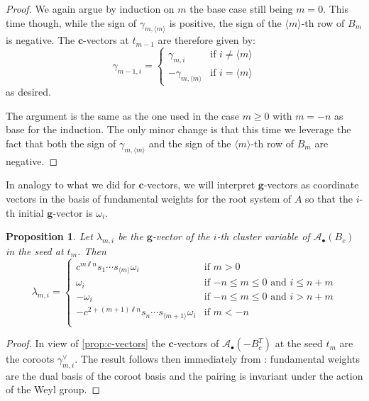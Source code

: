 \documentclass[11pt]{amsart}
\newcommand{\cAb}{\mathcal{A}_\bullet}
\newcommand{\bfg}{\mathbf{g}}
\newcommand{\bfc}{\mathbf{c}}
\renewcommand{\mod}[1]{\langle {#1} \rangle}
\newtheorem{proposition}[theorem]{Proposition}
\numberwithin{equation}{section}
\begin{document}
\begin{proof}
  We again argue by induction on $m$ the base case still being $m=0$. 
  This time though, while the sign of $\gamma_{m,\mod{m}}$ is positive, the sign of the $\mod{m}$-th row of $B_m$ is negative. 
  The $\bfc$-vectors at $t_{m-1}$ are therefore given by:
  \begin{equation*}
    \gamma_{m-1,i}
    =
    \begin{cases}
      \gamma_{m,i} & \text{if $i\neq \mod{m}$}\\
      -\gamma_{m,\mod{m}} & \text{if $i = \mod{m}$}
    \end{cases}
  \end{equation*}
  as desired.

  The argument is the same as the one used in the case $m\geq 0$ with $m=-n$ as base for the induction. 
  The only minor change is that this time we leverage the fact that both the sign of $\gamma_{m,\mod{m}}$ and the sign of the $\mod{m}$-th row of $B_m$ are negative.
\end{proof}

In analogy to what we did for $\bfc$-vectors, we will interpret $\bfg$-vectors as coordinate vectors in the basis of fundamental weights for the root system of $A$ so that the $i$-th initial $\bfg$-vector is $\omega_i$.
\begin{proposition}
  \label{prop:g-vectors}
  Let $\lambda_{m,i}$ be the $\bfg$-vector of the $i$-th cluster variable of $\cAb(B_c)$ in the seed at $t_m$. 
  Then
  \begin{equation}
    \lambda_{m,i}
    =
    \begin{cases}
      c^{m\sslash n}s_1\cdots s_{\mod{m}} \omega_i & \text{if $m>0$}\\
      \omega_i & \text{if $-n\leq m \leq 0$ and  $i\leq n+m$} \\
      -\omega_i & \text{if $-n\leq m \leq 0$ and $i>n+m$} \\
      -c^{2+(m+1)\sslash n}s_n\cdots s_{\mod{m+1}} \omega_i & \text{if $m <-n$}\\
    \end{cases}
  \end{equation}
\end{proposition}

\begin{proof}
  In view of \cref{prop:c-vectors} the $\bfc$-vectors of $\cAb(-B_c^T)$ at the seed $t_m$ are the coroots $\gamma_{m,i}^\vee$.
  The result follows then immediately from \cite[Theorem 1.2]{NZ12}: fundamental weights are the dual basis of the coroot basis and the pairing is invariant under the action of the Weyl group.
\end{proof}
\end{document}
